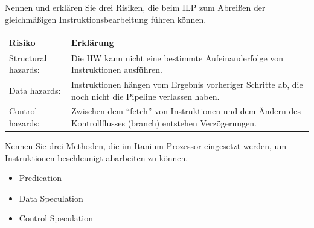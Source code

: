 {
  Nennen und erklären Sie drei Risiken,
  die beim ILP zum Abreißen der gleichmäßigen Instruktionsbearbeitung führen können.
}
{
  \begin{tabularx}{\textwidth}{|l|X|}
    \toprule
    Risiko              & Erklärung                                                                                                           \\
    \midrule
    Structural hazards: & Die HW kann nicht eine bestimmte Aufeinanderfolge von Instruktionen ausführen.                                      \\
    \midrule
    Data hazards:       & Instruktionen hängen vom Ergebnis vorheriger Schritte ab,
    die noch nicht die Pipeline verlassen haben.                                                                                              \\
    \midrule
    Control hazards:    & Zwischen dem \enquote{fetch} von Instruktionen und dem Ändern des Kontrollflusses (branch) entstehen Verzögerungen. \\
    \bottomrule
  \end{tabularx}
}

{
  Nennen Sie drei Methoden,
  die im Itanium Prozessor eingesetzt werden,
  um Instruktionen beschleunigt abarbeiten zu können.
}
{
  \begin{itemize}
    \item Predication
    \item Data Speculation
    \item Control Speculation
  \end{itemize}
}
